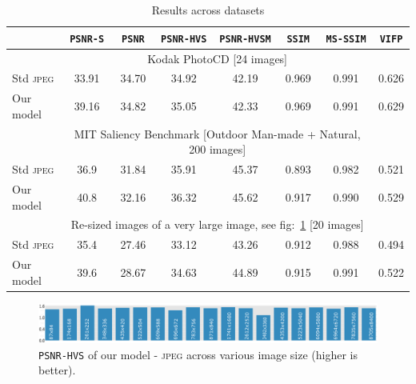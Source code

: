 \begin{table}
\centering
{}
\begin{tabular}{lccccccc}
			 \toprule
               & \texttt{PSNR-S} \phantom{so} & \texttt{PSNR} \phantom{so} & \texttt{PSNR-HVS} \phantom{so}& \texttt{PSNR-HVSM} \phantom{so}& \texttt{SSIM} \phantom{so}& \texttt{MS-SSIM} \phantom{so}& \texttt{VIFP}\phantom{so} \\
              \midrule
              & \multicolumn{6}{c}{Kodak PhotoCD [24 images]}   &                        \\
              \midrule
Std \textsc{jpeg} &   33.91   & 34.70     & 34.92          & 42.19  & 0.969  & 0.991 & 0.626      \\
			  \cline{2-8}
Our model &  39.16    & 34.82    & 35.05          & 42.33  & 0.969  & 0.991 & 0.629     \\
			  \midrule
              & \multicolumn{6}{c}{MIT Saliency Benchmark [Outdoor Man-made + Natural, 200 images]} &              \\
			  \midrule
Std \textsc{jpeg} & 36.9 & 31.84    & 35.91   & 45.37 & 0.893 & 0.982     & 0.521      \\
			  \cline{2-8}
Our model & 40.8 & 32.16   & 36.32   & 45.62 &  0.917 & 0.990      & 0.529      \\
			  \midrule
              & \multicolumn{6}{c}{Re-sized images of a very large image, see fig:~\ref{fig_size} [20 images]} &          \\
			  \midrule
Std \textsc{jpeg} & 35.4   & 27.46  & 33.12 & 43.26     & 0.912 & 0.988 & 0.494     \\
			  \cline{2-8}
Our model & 39.6  & 28.67  & 34.63 & 44.89     & 0.915 & 0.991 & 0.522     \\
			  \toprule
\end{tabular}
\caption[Results across various datasets]{Results across datasets \label{tbl_results}}
\end{table}
        
\begin{figure}
    \centering
    \includegraphics[scale=0.23]{figures/semantic/image_size.pdf}
    \caption[Impact on Image Size]{\texttt{PSNR-HVS} of our model - \textsc{jpeg} across various image size (higher is better). \label{fig_size}}
\end{figure}

